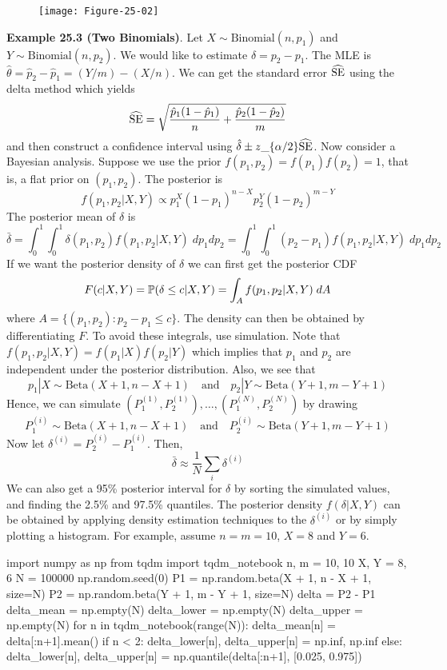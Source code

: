 \begin{figure}[H]
\centering
\texttt{[image: Figure-25-02]}
\end{figure}

\textbf{Example 25.3 (Two Binomials)}. Let
\(X \sim \text{Binomial}(n, p_{1})\) and
\(Y \sim \text{Binomial}(n, p_{2})\). We would like to estimate
\(\delta = p_{2} - p_{1}\). The MLE is
\(\hat{\theta} = \hat{p}_{2} - \hat{p}_{1} = (Y / m) - (X / n)\). We can get
the standard error \(\widehat{\operatorname{\mathrm{SE}}}\) using the delta method which
yields
\[
\widehat{\operatorname{\mathrm{SE}}} = \sqrt{\frac{\hat{p}_{1} (1 - \hat{p}_{1})}{n} + \frac{\hat{p}_{2} (1 - \hat{p}_{2})}{m}}
\]
and then construct a confidence interval using $\hat{\delta}
\pm z\_\{\alpha / 2\} \widehat{\operatorname{\mathrm{SE}}} $. Now consider a Bayesian
analysis. Suppose we use the prior \(f(p_{1}, p_{2}) = f(p_{1}) f(p_{2}) = 1\),
that is, a flat prior on \((p_{1}, p_{2})\). The posterior is
\[
f(p_{1}, p_{2} | X, Y) \propto p_{1}^{X} (1 - p_{1})^{n - X} p_{2}^Y (1 - p_{2})^{m - Y}
\]
The posterior mean of \(\delta\) is
\[
\bar{\delta} = \int_{0}^{1} \int_{0}^{1} \delta(p_{1}, p_{2}) f(p_{1}, p_{2} | X, Y) \; dp_{1} dp_{2} = \int_{0}^{1} \int_{0}^{1} (p_{2} - p_{1}) f(p_{1}, p_{2} | X, Y) \; dp_{1} dp_{2}
\]
If we want the posterior density of \(\delta\) we can first get the
posterior CDF
\[
F(c | X, Y) = \operatorname{\mathbb{P}}(\delta \leq c | X, Y) = \int_A f(p_{1}, p_{2} | X, Y) \; dA
\]
where \(A = \{ (p_{1}, p_{2}) : p_{2} - p_{1} \leq c \}\). The density can then
be obtained by differentiating \(F\).
To avoid these integrals,  use simulation. Note that
\(f(p_{1}, p_{2} | X, Y) = f(p_{1} | X) f(p_{2} | Y)\) which implies that
\(p_{1}\) and \(p_{2}\) are independent under the posterior distribution.
Also, we see that
\[
p_{1} | X \sim \text{Beta}(X + 1, n - X + 1) 
\quad \text{and} \quad
p_{2} | Y \sim \text{Beta}(Y + 1, m - Y + 1) 
\]
Hence, we can simulate
\((P_{1}^{(1)}, P_{2}^{(1)}), \dots, (P_{1}^{(N)}, P_{2}^{(N)})\) by drawing
\[
P_{1}^{(i)} \sim \text{Beta}(X + 1, n - X + 1) 
\quad \text{and} \quad
P_{2}^{(i)} \sim \text{Beta}(Y + 1, m - Y + 1) 
\]
Now let \(\delta^{(i)} = P_{2}^{(i)} - P_{1}^{(i)}\). Then,
\[
\bar{\delta} \approx \frac{1}{N} \sum_{i} \delta^{(i)}
\]
We can also get a 95\% posterior interval for \(\delta\) by sorting the
simulated values, and finding the 2.5\% and 97.5\% quantiles. The
posterior density \(f(\delta | X, Y)\) can be obtained by applying
density estimation techniques to the \(\delta^{(i)}\) or by simply
plotting a histogram.
For example, assume \(n = m = 10\), \(X = 8\) and \(Y = 6\).

\begin{python}
import numpy as np
from tqdm import tqdm_notebook
n, m = 10, 10
X, Y = 8, 6
N = 100000
np.random.seed(0)
P1 = np.random.beta(X + 1, n - X + 1, size=N)
P2 = np.random.beta(Y + 1, m - Y + 1, size=N)
delta = P2 - P1
delta_mean = np.empty(N)
delta_lower = np.empty(N)
delta_upper = np.empty(N)
for n in tqdm_notebook(range(N)):
    delta_mean[n] = delta[:n+1].mean()
    if n < 2:
        delta_lower[n], delta_upper[n] = np.inf, np.inf
    else:
        delta_lower[n], delta_upper[n] = np.quantile(delta[:n+1], [0.025, 0.975])
\end{python}

